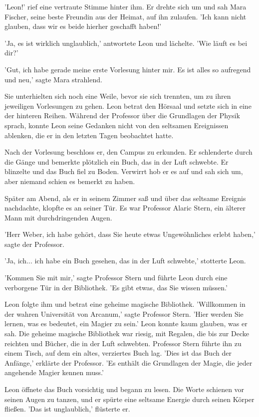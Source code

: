 \documentclass[12pt]{article}
\begin{document}
'Leon!' rief eine vertraute Stimme hinter ihm. Er drehte sich um und sah Mara Fischer, seine beste Freundin aus der Heimat, auf ihn zulaufen. 'Ich kann nicht glauben, dass wir es beide hierher geschafft haben!' 

'Ja, es ist wirklich unglaublich,' antwortete Leon und lächelte. 'Wie läuft es bei dir?' 

'Gut, ich habe gerade meine erste Vorlesung hinter mir. Es ist alles so aufregend und neu,' sagte Mara strahlend. 

Sie unterhielten sich noch eine Weile, bevor sie sich trennten, um zu ihren jeweiligen Vorlesungen zu gehen. Leon betrat den Hörsaal und setzte sich in eine der hinteren Reihen. Während der Professor über die Grundlagen der Physik sprach, konnte Leon seine Gedanken nicht von den seltsamen Ereignissen ablenken, die er in den letzten Tagen beobachtet hatte. 

Nach der Vorlesung beschloss er, den Campus zu erkunden. Er schlenderte durch die Gänge und bemerkte plötzlich ein Buch, das in der Luft schwebte. Er blinzelte und das Buch fiel zu Boden. Verwirrt hob er es auf und sah sich um, aber niemand schien es bemerkt zu haben. 

Später am Abend, als er in seinem Zimmer saß und über das seltsame Ereignis nachdachte, klopfte es an seiner Tür. Es war Professor Alaric Stern, ein älterer Mann mit durchdringenden Augen. 

'Herr Weber, ich habe gehört, dass Sie heute etwas Ungewöhnliches erlebt haben,' sagte der Professor. 

'Ja, ich... ich habe ein Buch gesehen, das in der Luft schwebte,' stotterte Leon. 

'Kommen Sie mit mir,' sagte Professor Stern und führte Leon durch eine verborgene Tür in der Bibliothek. 'Es gibt etwas, das Sie wissen müssen.' 

Leon folgte ihm und betrat eine geheime magische Bibliothek. 'Willkommen in der wahren Universität von Arcanum,' sagte Professor Stern. 'Hier werden Sie lernen, was es bedeutet, ein Magier zu sein.' Leon konnte kaum glauben, was er sah. Die geheime magische Bibliothek war riesig, mit Regalen, die bis zur Decke reichten und Bücher, die in der Luft schwebten. Professor Stern führte ihn zu einem Tisch, auf dem ein altes, verziertes Buch lag. 'Dies ist das Buch der Anfänge,' erklärte der Professor. 'Es enthält die Grundlagen der Magie, die jeder angehende Magier kennen muss.'

Leon öffnete das Buch vorsichtig und begann zu lesen. Die Worte schienen vor seinen Augen zu tanzen, und er spürte eine seltsame Energie durch seinen Körper fließen. 'Das ist unglaublich,' flüsterte er.
\end{document}
